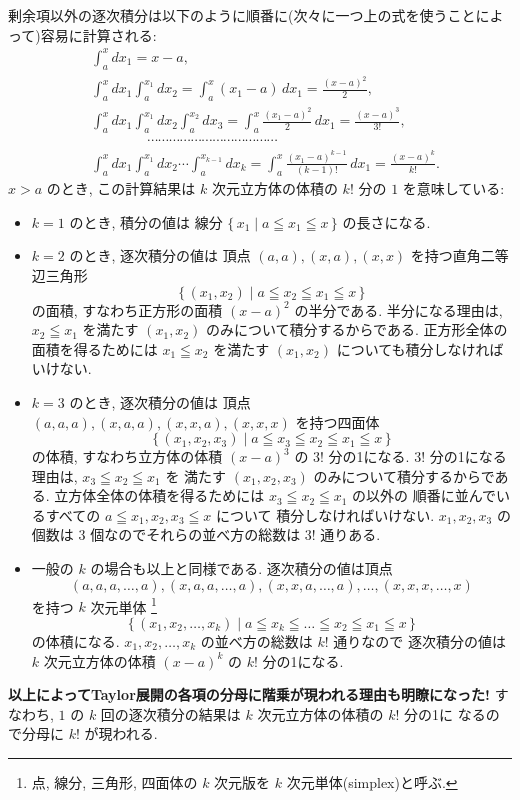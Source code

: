 \documentclass[12pt,twoside]{jarticle}
\theoremstyle{jplain}
\theoremstyle{jplain}
\theoremstyle{jplain}
\numberwithin{theorem}{section}
\numberwithin{equation}{section}
\numberwithin{figure}{section}
\numberwithin{table}{section}
\begin{document}
剰余項以外の逐次積分は以下のように順番に(次々に一つ上の式を使うことによって)容易に計算される:
\begin{align*}
&
\int_a^x\!\!\!dx_1 = x-a,
\\ &
\int_a^x\!\!\!dx_1\int_a^{x_1}\!\!\!dx_2
=\int_a^x (x_1-a)\,dx_1
=\frac{(x-a)^2}{2},
\\ &
\int_a^x\!\!\!dx_1\int_a^{x_1}\!\!\!dx_2\int_a^{x_2}\!\!\!dx_3
=\int_a^x\frac{(x_1-a)^2}{2}\,dx_1
=\frac{(x-a)^3}{3!},
\\ &
\qquad\qquad\cdots\cdots\cdots\cdots\cdots\cdots\cdots\cdots\cdots\cdots\cdots\cdots
\\ &
\int_a^x\!\!\!dx_1\int_a^{x_1}\!\!\!dx_2\cdots\!\!\int_a^{x_{k-1}}\!\!\!dx_k
=\int_a^x\frac{(x_1-a)^{k-1}}{(k-1)!}\,dx_1
=\frac{(x-a)^k}{k!}.
\end{align*}
$x>a$ のとき, この計算結果は $k$ 次元立方体の体積の $k!$ 分の $1$ を意味している:
\begin{itemize}
\item $k=1$ のとき, 積分の値は
線分 $\{\, x_1 \mid a\leqq x_1\leqq x\,\}$ の長さになる.

\item $k=2$ のとき, 逐次積分の値は
頂点 $(a,a),(x,a),(x,x)$ を持つ直角二等辺三角形
\[
\{\,(x_1,x_2)\mid a\leqq x_2\leqq x_1\leqq x\,\}
\]
の面積, すなわち正方形の面積 $(x-a)^2$ の半分である.
半分になる理由は, $x_2\leqq x_1$ を満たす $(x_1,x_2)$
のみについて積分するからである. 正方形全体の面積を得るためには
$x_1\leqq x_2$ を満たす $(x_1,x_2)$ についても積分しなければいけない.

\item $k=3$ のとき, 逐次積分の値は
頂点 $(a,a,a),(x,a,a),(x,x,a),(x,x,x)$ を持つ四面体
\[
\{\,(x_1,x_2,x_3)\mid a\leqq x_3\leqq x_2\leqq x_1\leqq x\,\}
\]
の体積, すなわち立方体の体積 $(x-a)^3$ の $3!$ 分の1になる.
$3!$ 分の1になる理由は, $x_3\leqq x_2\leqq x_1$ を
満たす $(x_1,x_2,x_3)$ のみについて積分するからである.
立方体全体の体積を得るためには $x_3\leqq x_2\leqq x_1$ の以外の
順番に並んでいるすべての $a\leqq x_1,x_2,x_3\leqq x$ について
積分しなければいけない.
$x_1,x_2,x_3$ の個数は $3$ 個なのでそれらの並べ方の総数は $3!$ 通りある.

\item 一般の $k$ の場合も以上と同様である.
逐次積分の値は頂点
\[
(a,a,a,\ldots,a),(x,a,a,\ldots,a),(x,x,a,\ldots,a),\ldots,(x,x,x,\ldots,x)
\]
を持つ $k$ 次元単体%
\footnote{点, 線分, 三角形, 四面体の $k$ 次元版を $k$ 次元単体(simplex)と呼ぶ.}
\[
\{\,(x_1,x_2,\ldots,x_k)\mid a\leqq x_k\leqq\ldots\leqq x_2\leqq x_1\leqq x\,\}
\]
の体積になる.
$x_1,x_2,\ldots,x_k$ の並べ方の総数は $k!$ 通りなので
逐次積分の値は $k$ 次元立方体の体積 $(x-a)^k$ の $k!$ 分の1になる.
\end{itemize}
{\bfseries 以上によってTaylor展開の各項の分母に階乗が現われる理由も明瞭になった!}
すなわち, $1$ の $k$ 回の逐次積分の結果は $k$ 次元立方体の体積の $k!$ 分の1に
なるので分母に $k!$ が現われる.
\end{document}
